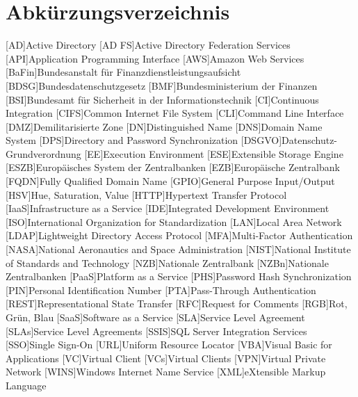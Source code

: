 
\chapter{Abkürzungsverzeichnis}
\begin{acronym}[WHATWG ]
\setlength{\itemsep}{-\parsep}
[AD]{Active Directory}
[AD FS]{Active Directory Federation Services}
[API]{Application Programming Interface}
[AWS]{Amazon Web Services}
[BaFin]{Bundesanstalt für Finanzdienstleistungsaufsicht}
[BDSG]{Bundesdatenschutzgesetz}
[BMF]{Bundesministerium der Finanzen}
[BSI]{Bundesamt für Sicherheit in der Informationstechnik}
[CI]{Continuous Integration}
[CIFS]{Common Internet File System}
[CLI]{Command Line Interface}
[DMZ]{Demilitarisierte Zone}
[DN]{Distinguished Name}
[DNS]{Domain Name System}
[DPS]{Directory and Password Synchronization}
[DSGVO]{Datenschutz-Grundverordnung}
[EE]{Execution Environment}
[ESE]{Extensible Storage Engine}
[ESZB]{Europäisches System der Zentralbanken}
[EZB]{Europäische Zentralbank}
[FQDN]{Fully Qualified Domain Name}
[GPIO]{General Purpose Input/Output}
[HSV]{Hue, Saturation, Value}
[HTTP]{Hypertext Transfer Protocol}
[IaaS]{Infrastructure as a Service}
[IDE]{Integrated Development Environment}
[ISO]{International Organization for Standardization}
[LAN]{Local Area Network}
[LDAP]{Lightweight Directory Access Protocol}
[MFA]{Multi-Factor Authentication}
[NASA]{National Aeronautics and Space Administration}
[NIST]{National Institute of Standards and Technology}
[NZB]{Nationale Zentralbank}
[NZBn]{Nationale Zentralbanken}
[PaaS]{Platform as a Service}
[PHS]{Password Hash Synchronization}
[PIN]{Personal Identification Number}
[PTA]{Pass-Through Authentication}
[REST]{Representational State Transfer}
[RFC]{Request for Comments}
[RGB]{Rot, Grün, Blau}
[SaaS]{Software as a Service}
[SLA]{Service Level Agreement}
[SLAs]{Service Level Agreements}
[SSIS]{SQL Server Integration Services}
[SSO]{Single Sign-On}
[URL]{Uniform Resource Locator}
[VBA]{Visual Basic for Applications}
[VC]{Virtual Client}
[VCs]{Virtual Clients}
[VPN]{Virtual Private Network}
[WINS]{Windows Internet Name Service}
[XML]{eXtensible Markup Language}
\end{acronym}